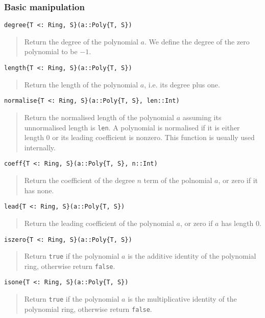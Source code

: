 \documentclass[a4paper,10pt]{article}
\newcommand{\code}{\lstinline}
\newcommand{\desc}[1]{\vspace{-3mm}\begin{quote}#1\end{quote}}
\begin{document}
{{{\subsubsection{Basic manipulation}

\begin{lstlisting}
degree{T <: Ring, S}(a::Poly{T, S})
\end{lstlisting}

\desc{Return the degree of the polynomial $a$. We define the degree of the zero
polynomial to be $-1$.}

\begin{lstlisting}
length{T <: Ring, S}(a::Poly{T, S})
\end{lstlisting}

\desc{Return the length of the polynomial $a$, i.e. its degree plus one.}

\begin{lstlisting}
normalise{T <: Ring, S}(a::Poly{T, S}, len::Int)
\end{lstlisting}

\desc{Return the normalised length of the polynomial $a$ assuming its unnormalised
length is \code{len}. A polynomial is normalised if it is either length $0$ or its
leading coefficient is nonzero. This function is usually used internally.}

\begin{lstlisting}
coeff{T <: Ring, S}(a::Poly{T, S}, n::Int)
\end{lstlisting}

\desc{Return the coefficient of the degree $n$ term of the polnomial $a$, or zero
if it has none.}

\begin{lstlisting}
lead{T <: Ring, S}(a::Poly{T, S})
\end{lstlisting}

\desc{Return the leading coefficient of the polynomial $a$, or zero if $a$ has
length $0$.}

\begin{lstlisting}
iszero{T <: Ring, S}(a::Poly{T, S})
\end{lstlisting}

\desc{Return \code{true} if the polynomial $a$ is the additive identity of the
polynomial ring, otherwise return \code{false}.}

\begin{lstlisting}
isone{T <: Ring, S}(a::Poly{T, S})
\end{lstlisting}

\desc{Return \code{true} if the polynomial $a$ is the multiplicative identity
of the polynomial ring, otherwise return \code{false}.}

}}}
\end{document}
